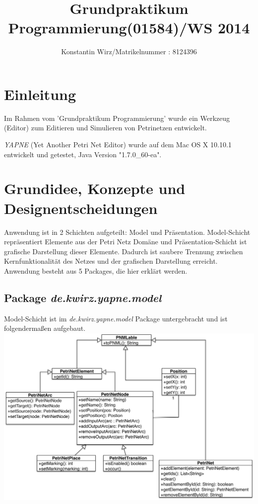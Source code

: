 \documentclass[12pt]{article}
\author{Konstantin Wirz/Matrikelnummer : 8124396}
\title{Grundpraktikum Programmierung(01584)/WS 2014}
\begin{document}
\maketitle

\tableofcontents

\section{Einleitung}

Im Rahmen vom 'Grundpraktikum Programmierung' wurde ein Werkzeug (Editor) zum Editieren und Simulieren von Petrinetzen entwickelt.

\emph{YAPNE} (Yet Another Petri Net Editor) wurde auf dem Mac OS X 10.10.1 entwickelt und getestet, Java Version "1.7.0\_60-ea".


\section{Grundidee, Konzepte und Designentscheidungen}
Anwendung ist in 2 Schichten aufgeteilt: Model und Präsentation. Model-Schicht repräsentiert Elemente aus der Petri Netz Domäne und Präsentation-Schicht ist grafische Darstellung dieser Elemente. Dadurch ist saubere Trennung zwischen Kernfunktionalität des Netzes und der grafischen Darstellung erreicht. Anwendung besteht aus 5 Packages, die hier erklärt werden. \\

\subsection{Package \emph{de.kwirz.yapne.model}}

Model-Schicht ist im \emph{de.kwirz.yapne.model} Package untergebracht und ist folgendermaßen aufgebaut.\\
\includegraphics[width=\linewidth]{model}
\end{document}
